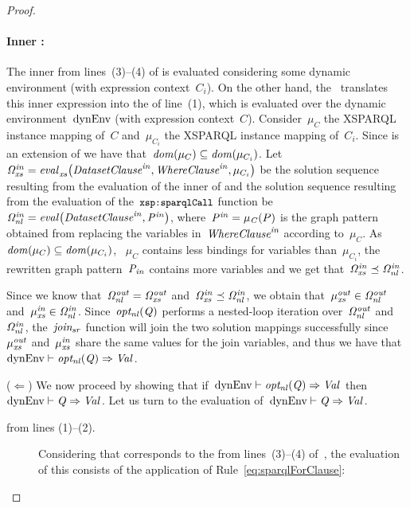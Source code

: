 \begin{proof}
  \paragraph*{Inner \SparqlForClause:} The inner \SparqlForClause from lines~(3)--(4) of  is evaluated
  considering some dynamic environment  (with expression context~$C_i$).
  On the other hand, the~ translates this inner expression into the  of
  line~(1), which is evaluated over the dynamic environment~${\textrm{dynEnv}}$ (with expression context~$C$).
  Consider~$\mu_C$ the XSPARQL instance mapping of~$C$ and~$\mu_{C_i}$ the XSPARQL instance mapping of~$C_i$.
  Since  is an extension of \dyn we have that~$\mathit{dom}\!\left(\mu_C\right) \subseteq \mathit{dom}\!\left(\mu_{C_i}\right)$.
  Let~${\mathit{\Omega}}_{\mathit{xs}}^{\mathit{in}} = \mathit{{\mathit{eval}}_{\mathit{xs}}^{\mathit{}}}\!\left({\mathit{{\textit{Da\-ta\-set\-Clau\-se}}}}_{\mathit{}}^{\mathit{in}}, {\mathit{{\textit{Whe\-re\-Clause}}}}_{\mathit{}}^{\mathit{in}}, \mu_{C_i}\right)$ be the solution
  sequence resulting from the evaluation of the inner \SparqlForClause of  and the solution sequence
  resulting from the evaluation of the~$\texttt{{\small \texttt{{\small xsp{:}}}sparqlCall}}$ function be~${\mathit{\Omega}}_{\mathit{nl}}^{\mathit{in}} =
  \mathit{eval}\!\left({\mathit{{\textit{Da\-ta\-set\-Clau\-se}}}}_{\mathit{}}^{\mathit{in}}, {\mathit{P}}_{\mathit{}}^{\mathit{in}}\right)$, where~${\mathit{P}}_{\mathit{}}^{\mathit{in}} = \mathit{\mu_C}\!\left(P\right)$ is the graph pattern obtained
  from replacing the variables in~${\mathit{{\textit{Whe\-re\-Clause}}}}_{\mathit{}}^{\mathit{in}}$ according to~$\mu_C$.
  As~$\mathit{dom}\!\left(\mu_C\right) \subseteq \mathit{dom}\!\left(\mu_{C_i}\right)$, \ie~$\mu_C$ contains less bindings for variables than~$\mu_{C_i}$, the
  rewritten graph pattern~$\mathit{{P}_{in}}$ contains more variables and we get that~${\mathit{\Omega}}_{\mathit{xs}}^{\mathit{in}} \preceq {\mathit{\Omega}}_{\mathit{nl}}^{\mathit{in}}$.

  \medskip

  Since we know that~${\mathit{\Omega}}_{\mathit{nl}}^{\mathit{out}} = {\mathit{\Omega}}_{\mathit{xs}}^{\mathit{out}}$ and~${\mathit{\Omega}}_{\mathit{xs}}^{\mathit{in}} \preceq {\mathit{\Omega}}_{\mathit{nl}}^{\mathit{in}}$, we obtain that~${\mathit{\mu}}_{\mathit{xs}}^{\mathit{out}}
  \in {\mathit{\Omega}}_{\mathit{nl}}^{\mathit{out}}$ and~${\mathit{\mu}}_{\mathit{xs}}^{\mathit{in}} \in {\mathit{\Omega}}_{\mathit{nl}}^{\mathit{in}}$.  Since~$\mathit{opt_{nl}}\!\left(\mathit{{Q}_{}}\right)$ performs a nested-loop
  iteration over~${\mathit{\Omega}}_{\mathit{nl}}^{\mathit{out}}$ and~${\mathit{\Omega}}_{\mathit{nl}}^{\mathit{in}}$, the~$\mathit{join_{sr}}$ function will  join the two solution
  mappings successfully since~${\mathit{\mu}}_{\mathit{xs}}^{\mathit{out}}$ and~${\mathit{\mu}}_{\mathit{xs}}^{\mathit{in}}$ share the same values for the join variables, and
  thus we have that~${\textrm{dynEnv}} \vdash \mathit{opt_{nl}}\!\left(\mathit{{Q}_{}}\right) \Rightarrow \mathit{{Val}_{}}$.


  \medskip \noindent ($\Leftarrow$)
  We now proceed by showing that if~${\textrm{dynEnv}} \vdash \mathit{opt_{nl}}\!\left(\mathit{{Q}_{}}\right) \Rightarrow \mathit{{Val}_{}}$ then~${\textrm{dynEnv}} \vdash \mathit{{Q}_{}}
  \Rightarrow \mathit{{Val}_{}}$.
  \noindent Let us turn to the evaluation of~${\textrm{dynEnv}} \vdash \mathit{{Q}_{}} \Rightarrow \mathit{{Val}_{}}$. 
  \begin{description}
  \item[\SparqlForClause from lines (1)--(2).] Considering that  corresponds to the \SparqlForClause
    from lines~(3)--(4) of~, the evaluation of this \SparqlForClause consists of the application of
    Rule~\eqref{eq:sparqlForClause}:


\end{description}
\end{proof}
